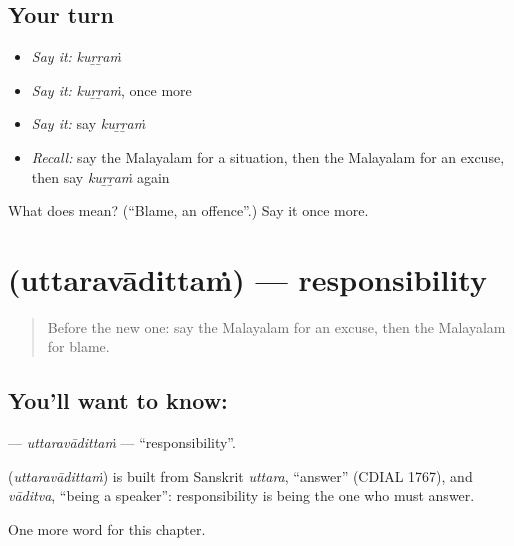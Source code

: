 \subsection*{Your turn}
\begin{itemize}
\raggedright
  \item \emph{Say it:} \emph{kuṟṟaṁ}
  \item \emph{Say it:} \emph{kuṟṟaṁ}, once more
  \item \emph{Say it:} say \emph{kuṟṟaṁ}
  \item \emph{Recall:} say the Malayalam for a situation, then the Malayalam for an excuse, then say \emph{kuṟṟaṁ} again
\end{itemize}

\begin{tcolorbox}[breakable,colback=teal!4,colframe=teal!35!black,title={Before you move on}]
What does  mean? (\textquotedblleft{}Blame, an offence\textquotedblright{}.) Say it once more.
\end{tcolorbox}
\section[\texorpdfstring{\ml{ഉത്തരവാദിത്തം} (uttaravādittaṁ)}{ഉത്തരവാദിത്തം (uttaravādittaṁ)}]{ (uttaravādittaṁ) — responsibility}

\label{lesson:ML-C243-uttaravadittam}



\begin{quote}
Before the new one: say the Malayalam for an excuse, then the Malayalam for blame.
\end{quote}

\subsection*{You'll want to know: }
\textbf{} — \emph{uttaravādittaṁ} — \textquotedblleft{}responsibility\textquotedblright{}.

\begin{cousinweb}
\textbf{} (\emph{uttaravādittaṁ}) is built from Sanskrit \emph{uttara}, \textquotedblleft{}answer\textquotedblright{} (CDIAL 1767), and \emph{vāditva}, \textquotedblleft{}being a speaker\textquotedblright{}: responsibility is being the one who must answer.
\end{cousinweb}

\begin{grammarlens}[title={What you've built}]
One more word for this chapter.
\end{grammarlens}

